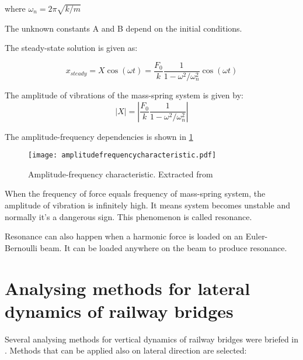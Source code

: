 where $\omega_n = 2\pi\sqrt{k/m}$

The unknown constants A and B depend on the initial conditions.

The steady-state solution is given as:

\begin{equation}
	x_{steady}= X \cos(\omega t) = \frac{F_0}{k}\frac{1}{1-\omega^2/\omega_n^2}\cos(\omega t)
\end{equation}

The amplitude of vibrations of the mass-spring system is given by:
\begin{equation}
	|X|=|\frac{F_0}{k}\frac{1}{1-\omega^2/\omega_n^2}|
\end{equation}

The amplitude-frequency dependencies is shown in \ref{fig:amplitude-frequency-characteristic} 

\begin{figure}[h]
	\centering
	\texttt{[image: amplitudefrequencycharacteristic.pdf]}
	\caption{Amplitude-frequency characteristic. Extracted from \citet[2.2.2]{dynamicslecturenote}}
	\label{fig:amplitude-frequency-characteristic}
\end{figure}

When the frequency of force equals frequency of mass-spring system, the amplitude of vibration is infinitely high. It means system becomes unstable and normally it's a dangerous sign. This phenomenon is called resonance.

Resonance can also happen when a harmonic force is loaded on an Euler-Bernoulli beam. It can be loaded anywhere on the beam to produce resonance. 


\section{Analysing methods for lateral dynamics of railway bridges }

Several analysing methods for vertical dynamics of railway bridges were briefed in \citet[A6.2]{UIC776-2}. Methods that can be applied also on lateral direction are selected:

